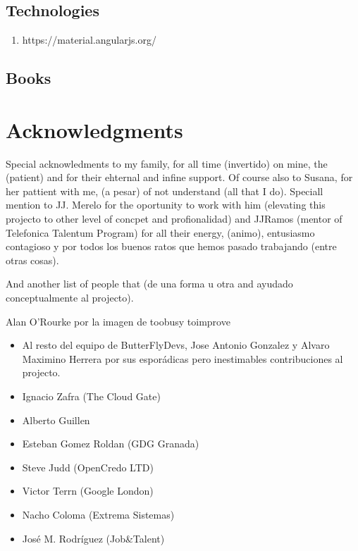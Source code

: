 \documentclass[oneside,english,titlepage]{scrbook}
\begin{document}
\section{Technologies}
\begin{enumerate}
\item https://material.angularjs.org/
\end{enumerate}

\section{Books}

\chapter{Acknowledgments}

Special acknowledments to my family, for all time (invertido) on mine, the (patient) and for their ehternal and infine support. Of course also to Susana, for her pattient with me, (a pesar) of not understand (all that I do). Speciall mention to JJ. Merelo for the oportunity to work with him (elevating this projecto to other level of concpet and profionalidad) and JJRamos (mentor of Telefonica Talentum Program) for all their energy, (animo), entusiasmo contagioso y por todos los buenos ratos que hemos pasado trabajando (entre otras cosas). 

And another list of people that (de una forma u otra and ayudado conceptualmente al projecto).


Alan O'Rourke por la imagen de toobusy toimprove

\begin{itemize}
\item Al resto del equipo de ButterFlyDevs, Jose Antonio Gonzalez y Alvaro Maximino Herrera por sus esporádicas pero inestimables contribuciones al projecto.
\item Ignacio Zafra (The Cloud Gate)
\item Alberto Guillen
\item Esteban Gomez Roldan (GDG Granada)
\item Steve Judd (OpenCredo LTD)
\item Victor Terrn (Google London)
\item Nacho Coloma (Extrema Sistemas)
\item José M. Rodríguez (Job\&Talent)
\end{itemize}

\nocite{*}

\end{document}
